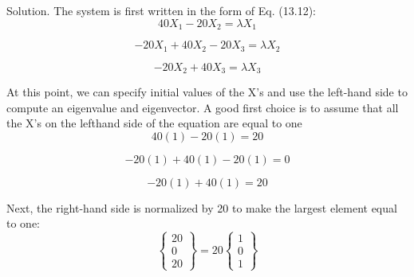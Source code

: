 \documentclass[../main.tex]{subfiles}
\begin{document}
Solution. The system is first written in the form of Eq. (13.12):
\begin{equation}
40X_{1}-20X_{2}=\lambda X_{1}
\end{equation}

\begin{equation}
-20X_{1}+40X_{2}-20X_{3}=\lambda X_{2}
\end{equation}

\begin{equation}
-20X_{2}+40X_{3}=\lambda X_{3}
\end{equation}

At this point, we can specify initial values of the X’s and use the left-hand side to compute
an eigenvalue and eigenvector. A good first choice is to assume that all the X’s on the lefthand side of the equation are equal to one
\begin{equation}
40(1) - 20(1) = 20
\end{equation}

\begin{equation}
-20(1) + 40(1) - 20(1) = 0
\end{equation}

\begin{equation}
- 20(1) + 40(1) = 20
\end{equation}

Next, the right-hand side is normalized by 20 to make the largest element equal to one:
\begin{equation}
\begin{Bmatrix}
20\\
0\\
20
\end{Bmatrix}
= 20\begin{Bmatrix}
1\\
0\\
1
\end{Bmatrix}
\end{equation}
\end{document}
